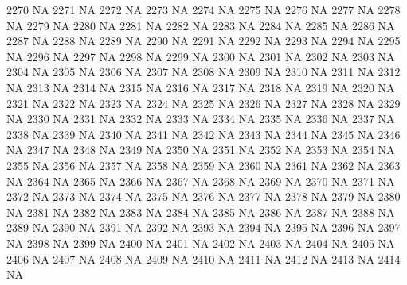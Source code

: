 \documentclass{article}
\begin{document}
\begin{Schunk}
\begin{Soutput}
2270           NA
2271           NA
2272           NA
2273           NA
2274           NA
2275           NA
2276           NA
2277           NA
2278           NA
2279           NA
2280           NA
2281           NA
2282           NA
2283           NA
2284           NA
2285           NA
2286           NA
2287           NA
2288           NA
2289           NA
2290           NA
2291           NA
2292           NA
2293           NA
2294           NA
2295           NA
2296           NA
2297           NA
2298           NA
2299           NA
2300           NA
2301           NA
2302           NA
2303           NA
2304           NA
2305           NA
2306           NA
2307           NA
2308           NA
2309           NA
2310           NA
2311           NA
2312           NA
2313           NA
2314           NA
2315           NA
2316           NA
2317           NA
2318           NA
2319           NA
2320           NA
2321           NA
2322           NA
2323           NA
2324           NA
2325           NA
2326           NA
2327           NA
2328           NA
2329           NA
2330           NA
2331           NA
2332           NA
2333           NA
2334           NA
2335           NA
2336           NA
2337           NA
2338           NA
2339           NA
2340           NA
2341           NA
2342           NA
2343           NA
2344           NA
2345           NA
2346           NA
2347           NA
2348           NA
2349           NA
2350           NA
2351           NA
2352           NA
2353           NA
2354           NA
2355           NA
2356           NA
2357           NA
2358           NA
2359           NA
2360           NA
2361           NA
2362           NA
2363           NA
2364           NA
2365           NA
2366           NA
2367           NA
2368           NA
2369           NA
2370           NA
2371           NA
2372           NA
2373           NA
2374           NA
2375           NA
2376           NA
2377           NA
2378           NA
2379           NA
2380           NA
2381           NA
2382           NA
2383           NA
2384           NA
2385           NA
2386           NA
2387           NA
2388           NA
2389           NA
2390           NA
2391           NA
2392           NA
2393           NA
2394           NA
2395           NA
2396           NA
2397           NA
2398           NA
2399           NA
2400           NA
2401           NA
2402           NA
2403           NA
2404           NA
2405           NA
2406           NA
2407           NA
2408           NA
2409           NA
2410           NA
2411           NA
2412           NA
2413           NA
2414           NA

\end{Soutput}
\end{Schunk}
\end{document}
